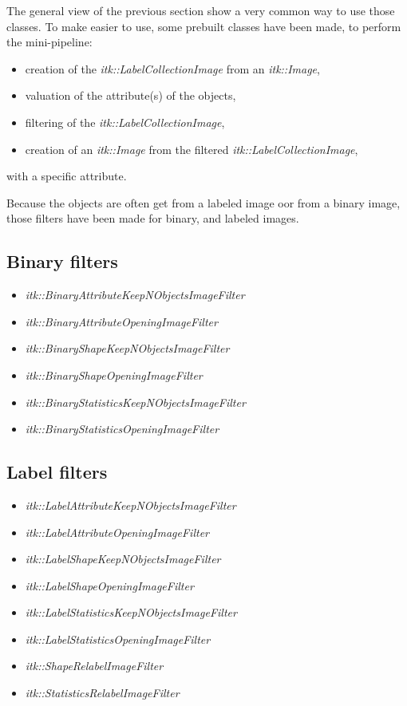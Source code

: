 \documentclass{InsightArticle}
\begin{document}
The general view of the previous section show a very common way to use those
classes. To make easier to use, some prebuilt classes have been made, to perform
the mini-pipeline:
\begin{itemize}
  \item creation of the {\em itk::LabelCollectionImage} from an {\em
itk::Image},
  \item valuation of the attribute(s) of the objects,
  \item filtering of the {\em itk::LabelCollectionImage},
  \item creation of an {\em itk::Image} from the filtered {\em
itk::LabelCollectionImage},
\end{itemize}
with a specific attribute.

Because the objects are often get from a labeled image oor from a binary image,
those filters have been made for binary, and labeled images.

\subsection{Binary filters}

\begin{itemize}
  \item {\em itk::BinaryAttributeKeepNObjectsImageFilter}
  \item {\em itk::BinaryAttributeOpeningImageFilter}
  \item {\em itk::BinaryShapeKeepNObjectsImageFilter}
  \item {\em itk::BinaryShapeOpeningImageFilter}
  \item {\em itk::BinaryStatisticsKeepNObjectsImageFilter}
  \item {\em itk::BinaryStatisticsOpeningImageFilter}
\end{itemize}

\subsection{Label filters}

\begin{itemize}
  \item {\em itk::LabelAttributeKeepNObjectsImageFilter}
  \item {\em itk::LabelAttributeOpeningImageFilter}
  \item {\em itk::LabelShapeKeepNObjectsImageFilter}
  \item {\em itk::LabelShapeOpeningImageFilter}
  \item {\em itk::LabelStatisticsKeepNObjectsImageFilter}
  \item {\em itk::LabelStatisticsOpeningImageFilter}
  \item {\em itk::ShapeRelabelImageFilter}
  \item {\em itk::StatisticsRelabelImageFilter}
\end{itemize}
\end{document}
